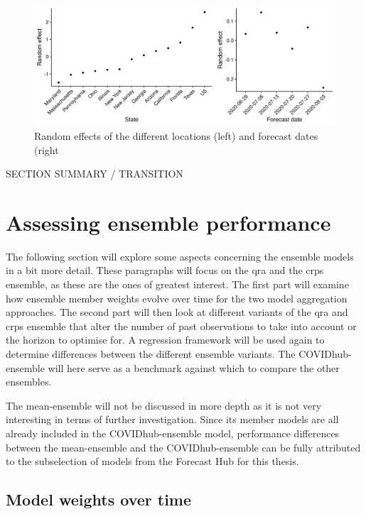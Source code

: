 \documentclass[
]{book}
\begin{document}
\begin{figure}
\includegraphics[width=1\linewidth]{../visualisation/chapter-5-results/random-effects} \caption{Random effects of the different locations (left) and forecast dates (right}\label{fig:random-effects}
\end{figure}

SECTION SUMMARY / TRANSITION

\hypertarget{assessing-ensemble-performance}{%
\section{Assessing ensemble performance}\label{assessing-ensemble-performance}}

The following section will explore some aspects concerning the ensemble models in a bit more detail. These paragraphs will focus on the qra and the crps ensemble, as these are the ones of greatest interest. The first part will examine how ensemble member weights evolve over time for the two model aggregation approaches. The second part will then look at different variants of the qra and crps ensemble that alter the number of past observations to take into account or the horizon to optimise for. A regression framework will be used again to determine differences between the different ensemble variants. The COVIDhub-ensemble will here serve as a benchmark against which to compare the other ensembles.

The mean-ensemble will not be discussed in more depth as it is not very interesting in terms of further investigation. Since its member models are all already included in the COVIDhub-ensemble model, performance differences between the mean-ensemble and the COVIDhub-ensemble can be fully attributed to the subselection of models from the Forecast Hub for this thesis.

\hypertarget{model-weights-over-time}{%
\subsection{Model weights over time}\label{model-weights-over-time}}
\end{document}
